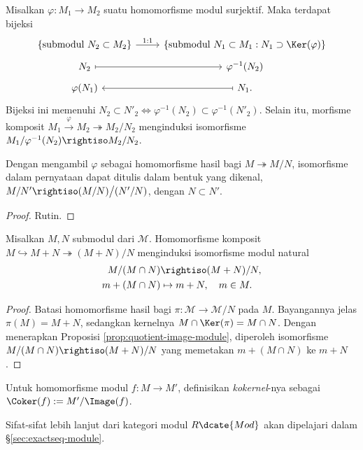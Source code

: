 \begin{proposition}\label{prop:2nd-homomorphism-module}
	Misalkan $\varphi: M_1 \to M_2$ suatu homomorfisme modul surjektif. Maka terdapat bijeksi
	\[ \begin{tikzcd}[row sep=tiny]
		\left\{ \text{submodul }  N_2 \subset M_2  \right\} \arrow[r, "1:1"] & \left\{ \text{submodul } N_1 \subset M_1 : N_1 \supset \Ker(\varphi)  \right\} \\
		N_2 \arrow[mapsto,r] & \varphi^{-1}(N_2) \\
		\varphi(N_1) & N_1 \arrow[mapsto, l].
	\end{tikzcd} \]
	Bijeksi ini memenuhi $N_2 \subset N'_2 \iff \varphi^{-1}(N_2) \subset \varphi^{-1}(N'_2)$. Selain itu, morfisme komposit $M_1 \xrightarrow{\varphi} M_2 \twoheadrightarrow M_2/N_2$ menginduksi isomorfisme $M_1/\varphi^{-1}(N_2) \rightiso M_2/N_2$.
\end{proposition}
Dengan mengambil $\varphi$ sebagai homomorfisme hasil bagi $M \twoheadrightarrow M/N$, isomorfisme dalam pernyataan dapat ditulis dalam bentuk yang dikenal, $M/N' \rightiso (M/N) \big/ (N'/N)$, dengan $N \subset N'$.
\begin{proof}
	Rutin.
\end{proof}

\begin{proposition}\label{prop:3rd-homomorphism-module}
	Misalkan $M, N$ submodul dari $\mathcal{M}$. Homomorfisme komposit $M \hookrightarrow M+N \twoheadrightarrow (M + N)/N$ menginduksi isomorfisme modul natural
	\begin{align*}
		M/(M \cap N) & \rightiso (M+N)/N, \\
		m + (M \cap N) & \mapsto m + N, \quad m \in M.
	\end{align*}
\end{proposition}
\begin{proof}
	Batasi homomorfisme hasil bagi $\pi: \mathcal{M} \to \mathcal{M}/N$ pada $M$. Bayangannya jelas $\pi(M) = M+N$, sedangkan kernelnya $M \cap \Ker(\pi) = M \cap N$. Dengan menerapkan Proposisi \ref{prop:quotient-image-module}, diperoleh isomorfisme $M/(M \cap N) \rightiso (M+N)/N$ yang memetakan $m + (M \cap N)$ ke $m + N$.
\end{proof}

\begin{definition}\label{def:cokernel}
	Untuk homomorfisme modul $f: M \to M'$, definisikan \emph{kokernel}-nya sebagai $\Coker(f) := M'/\Image(f)$.
\end{definition}
Sifat-sifat lebih lanjut dari kategori modul $R\dcate{Mod}$ akan dipelajari dalam \S\ref{sec:exactseq-module}.

